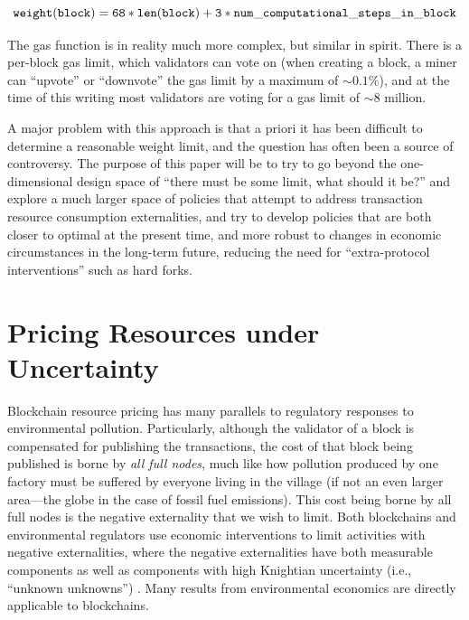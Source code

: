 \documentclass[12pt, final]{article}
\begin{document}
\begin{footnotesize}
\begin{equation}
\tt{weight(block) = 68 * len(block) + 3 * num\_computational\_steps\_in\_block}
\end{equation}
\end{footnotesize}

The gas function is in reality much more complex, but similar in spirit. There is a per-block gas limit, which validators can vote on (when creating a block, a miner can ``upvote'' or ``downvote'' the gas limit by a maximum of $\sim\!0.1\%$), and at the time of this writing most validators are voting for a gas limit of $\sim \! 8$ million.

A major problem with this approach is that a priori it has been difficult to determine a reasonable weight limit, and the question has often been a source of controversy\cite{blocksizedebate}. The purpose of this paper will be to try to go beyond the one-dimensional design space of ``there must be some limit, what should it be?'' and explore a much larger space of policies that attempt to address transaction resource consumption externalities, and try to develop policies that are both closer to optimal at the present time, and more robust to changes in economic circumstances in the long-term future, reducing the need for ``extra-protocol interventions'' such as hard forks.

\section{Pricing Resources under Uncertainty}
\label{sect:uncertainty}
Blockchain resource pricing has many parallels to regulatory responses to environmental pollution.  Particularly, although the validator of a block is compensated for publishing the transactions, the cost of that block being published is borne by \emph{all full nodes}, much like how pollution produced by one factory must be suffered by everyone living in the village (if not an even larger area—the globe in the case of fossil fuel emissions).  This cost being borne by all full nodes is the negative externality that we wish to limit.  Both blockchains and environmental regulators use economic interventions to limit activities with negative externalities, where the negative externalities have both measurable components as well as components with high Knightian uncertainty (i.e., ``unknown unknowns'') \cite{knight1921risk}.  Many results from environmental economics \cite{barder14} are directly applicable to blockchains.
\end{document}

